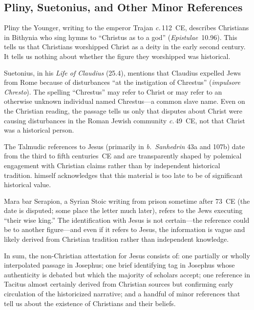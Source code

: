 \documentclass[12pt,oneside]{article}
\newcommand{\circa}{\textit{c.}\,}
\begin{document}
\subsection{Pliny, Suetonius, and Other Minor References}
\label{sec:external:minor}

Pliny the Younger, writing to the emperor Trajan \circa 112~CE, describes
Christians in Bithynia who sing hymns to ``Christus as to a god''
(\textit{Epistulae}~10.96).  This tells us that Christians worshipped
Christ as a deity in the early second century.  It tells us nothing about
whether the figure they worshipped was historical.

Suetonius, in his \textit{Life of Claudius} (25.4), mentions that
Claudius expelled Jews from Rome because of disturbances ``at the
instigation of Chrestus'' (\textit{impulsore Chresto}).  The spelling
``Chrestus'' may refer to Christ or may refer to an otherwise unknown
individual named Chrestus---a common slave name.  Even on the Christian
reading, the passage tells us only that disputes about Christ were
causing disturbances in the Roman Jewish community \circa 49~CE, not
that Christ was a historical person.

The Talmudic references to Jesus (primarily in \textit{b.~Sanhedrin}
43a and 107b) date from the third to fifth centuries~CE and are
transparently shaped by polemical engagement with Christian claims
rather than by independent historical tradition.  \citet{Ehrman2012}
himself acknowledges that this material is too late to be of significant
historical value.

Mara bar Serapion, a Syrian Stoic writing from prison sometime after
73~CE (the date is disputed; some place the letter much later), refers
to the Jews executing ``their wise king.''  The identification with
Jesus is not certain---the reference could be to another figure---and
even if it refers to Jesus, the information is vague and likely derived
from Christian tradition rather than independent knowledge.

In sum, the non-Christian attestation for Jesus consists of: one
partially or wholly interpolated passage in Josephus; one brief
identifying tag in Josephus whose authenticity is debated but which the
majority of scholars accept; one reference in Tacitus almost certainly
derived from Christian sources but confirming early circulation of the
historicized narrative; and a handful of minor references that tell us
about the existence of Christians and their beliefs.
\end{document}

